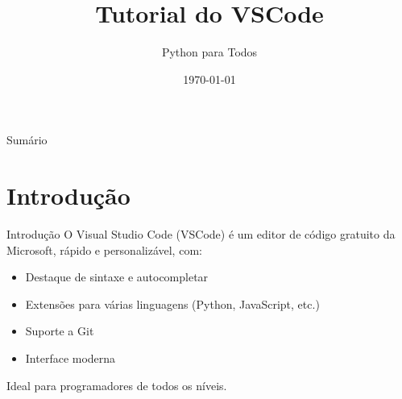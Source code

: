 \documentclass[fleqn,utf8,aspectratio=169,14pt]{beamer}
\title{Tutorial do VSCode}
\author{Python para Todos}
\date{\today}
\begin{document}
	

	\begin{frame}
		\titlepage
	\end{frame}
	

	\begin{frame}{Sumário}
		\tableofcontents
	\end{frame}
	

	\section{Introdução}
	\begin{frame}{Introdução}
		O Visual Studio Code (VSCode) é um editor de código gratuito da Microsoft, rápido e personalizável, com:
		\begin{itemize}
			\item Destaque de sintaxe e autocompletar
			\item Extensões para várias linguagens (Python, JavaScript, etc.)
			\item Suporte a Git
			\item Interface moderna
		\end{itemize}
		Ideal para programadores de todos os níveis.
	\end{frame}
	
\end{document}
